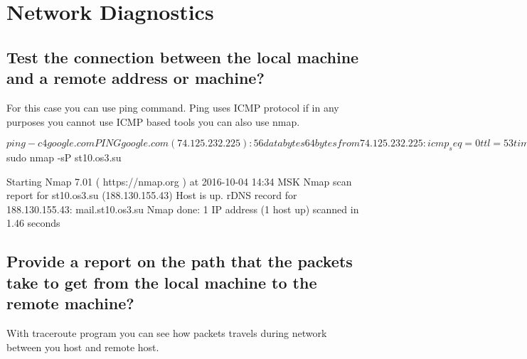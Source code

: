 \documentclass[a4paper,11pt]{article}
\begin{document}
\section{Network Diagnostics}
\subsection{Test the connection between the local machine and a remote address or machine?}
For this case you can use ping command. Ping uses ICMP protocol if in any purposes you cannot use ICMP based tools you can also use nmap.

\begin{bashcode}
$ ping -c 4 google.com
PING google.com (74.125.232.225): 56 data bytes
64 bytes from 74.125.232.225: icmp_seq=0 ttl=53 time=27.128 ms
64 bytes from 74.125.232.225: icmp_seq=1 ttl=53 time=27.862 ms
64 bytes from 74.125.232.225: icmp_seq=2 ttl=53 time=28.254 ms
64 bytes from 74.125.232.225: icmp_seq=3 ttl=53 time=28.349 ms

--- google.com ping statistics ---
4 packets transmitted, 4 packets received, 0.0%
round-trip min/avg/max/stddev = 27.128/27.898/28.349/0.481 ms

$ sudo nmap -sP st10.os3.su

Starting Nmap 7.01 ( https://nmap.org ) at 2016-10-04 14:34 MSK
Nmap scan report for st10.os3.su (188.130.155.43)
Host is up.
rDNS record for 188.130.155.43: mail.st10.os3.su
Nmap done: 1 IP address (1 host up) scanned in 1.46 seconds

\end{bashcode}

\subsection{Provide a report on the path that the packets take to get from the local machine to the remote machine?}
With traceroute program you can see how packets travels during network between you host and remote host.
\end{document}
